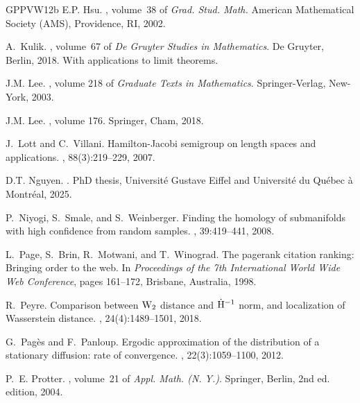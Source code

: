 \documentclass[10pt,a4paper]{article}
\begin{document}
{\begin{thebibliography}{GPPVW12b}
E.P. {Hsu}.
, volume~38 of {\em Grad. Stud.
  Math.}
\newblock American Mathematical Society (AMS), Providence, RI, 2002.

A.~{Kulik}.
, volume~67 of {\em De
  Gruyter Studies in Mathematics}.
\newblock De Gruyter, Berlin, 2018.
\newblock With applications to limit theorems.

J.M. Lee.
, volume 218 of {\em Graduate
  Texts in Mathematics}.
\newblock Springer-Verlag, New-York, 2003.

J.M. {Lee}.
, volume 176.
\newblock Springer, Cham, 2018.

J.~Lott and C.~Villani.
\newblock Hamilton-{J}acobi semigroup on length spaces and applications.
, 88(3):219--229, 2007.

D.T. Nguyen.
.
\newblock PhD thesis, Universit\'e Gustave Eiffel and Universit\'e du Qu\'ebec
  \`a Montr\'eal, 2025.

P.~Niyogi, S.~Smale, and S.~Weinberger.
\newblock Finding the homology of submanifolds with high confidence from random
  samples.
, 39:419--441, 2008.

L.~Page, S.~Brin, R.~Motwani, and T.~Winograd.
\newblock The pagerank citation ranking: Bringing order to the web.
\newblock In {\em Proceedings of the 7th International World Wide Web
  Conference}, pages 161--172, Brisbane, Australia, 1998.

R.~{Peyre}.
\newblock Comparison between {$\rm W_2$} distance and {$\dot {\rm H}^{-1}$}
  norm, and localization of {W}asserstein distance.
, 24(4):1489--1501, 2018.

G.~Pag\`es and F.~Panloup.
\newblock Ergodic approximation of the distribution of a stationary diffusion:
  rate of convergence.
, 22(3):1059--1100, 2012.

P.~E. {Protter}.
, volume~21 of
  {\em Appl. Math. (N. Y.)}.
\newblock Springer, Berlin, 2nd ed. edition, 2004.


\end{thebibliography}}
\end{document}
